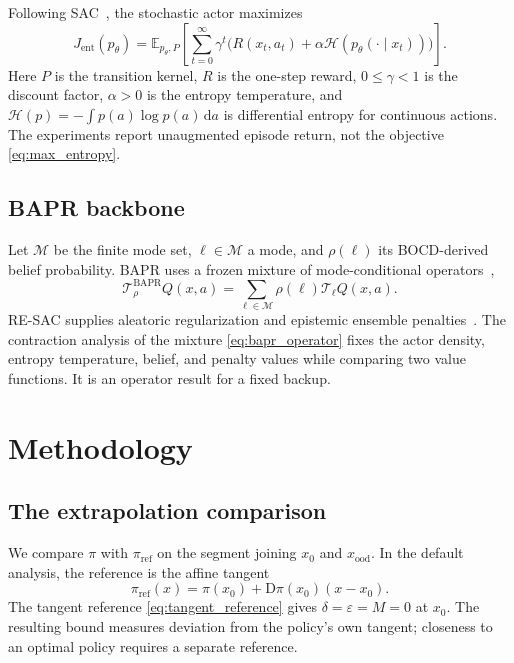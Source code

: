\documentclass[10pt]{article}
\begin{document}
Following SAC~\cite{Haarnoja2018SAC}, the stochastic actor maximizes
\begin{equation}
J_{\mathrm{ent}}(p_\theta)=
\mathbb{E}_{p_\theta,P}\left[
\sum_{t=0}^{\infty}\gamma^t
\bigl(R(x_t,a_t)+\alpha\mathcal{H}(p_\theta(\cdot\mid x_t))\bigr)
\right].
\label{eq:max_entropy}
\end{equation}
Here $P$ is the transition kernel, $R$ is the one-step reward, $0\leq\gamma<1$ is the discount factor, $\alpha>0$ is the entropy temperature, and $\mathcal{H}(p)=-\int p(a)\log p(a)\,\mathrm d a$ is differential entropy for continuous actions. The experiments report unaugmented episode return, not the objective \eqref{eq:max_entropy}.

\subsection{BAPR backbone}

Let $\mathcal{M}$ be the finite mode set, $\ell\in\mathcal{M}$ a mode, and $\rho(\ell)$ its BOCD-derived belief probability. BAPR uses a frozen mixture of mode-conditional operators~\cite{Zhang2025BAPR},
\begin{equation}
\mathcal{T}^{\mathrm{BAPR}}_\rho Q(x,a)
=\sum_{\ell\in\mathcal{M}}\rho(\ell)\mathcal{T}_\ell Q(x,a).
\label{eq:bapr_operator}
\end{equation}
RE-SAC supplies aleatoric regularization and epistemic ensemble penalties~\cite{Zhang2025RESAC}. The contraction analysis of the mixture \eqref{eq:bapr_operator} fixes the actor density, entropy temperature, belief, and penalty values while comparing two value functions. It is an operator result for a fixed backup.

\section{Methodology}

\subsection{The extrapolation comparison}
\label{sec:ood_problem}

We compare $\pi$ with $\pi_{\mathrm{ref}}$ on the segment joining $x_0$ and $x_{\mathrm{ood}}$. In the default analysis, the reference is the affine tangent
\begin{equation}
\pi_{\mathrm{ref}}(x)=\pi(x_0)+\mathrm{D}\pi(x_0)(x-x_0).
\label{eq:tangent_reference}
\end{equation}
The tangent reference \eqref{eq:tangent_reference} gives $\delta=\varepsilon=M=0$ at $x_0$. The resulting bound measures deviation from the policy's own tangent; closeness to an optimal policy requires a separate reference.
\end{document}
